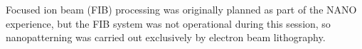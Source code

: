 %
%
%
%
%
%

Focused ion beam (FIB) processing was originally planned as part of the NANO experience, but the FIB system was not operational during this session, so nanopatterning was carried out exclusively by electron beam lithography.

